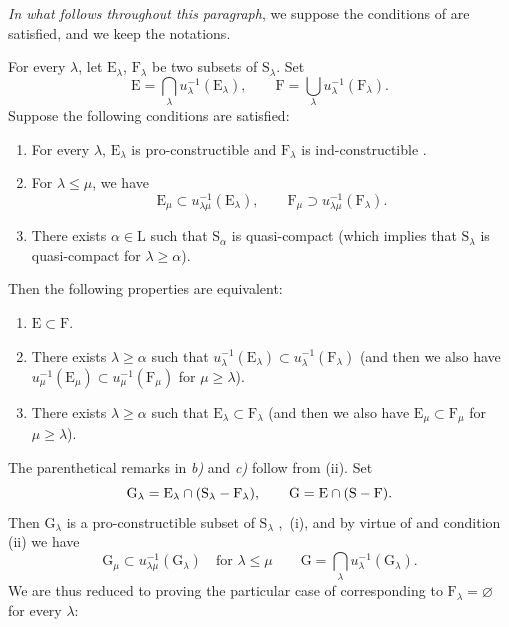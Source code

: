 \begin{env}[8.3.1]
\label{IV.8.3.1}
\emph{In what follows throughout this paragraph}, we suppose the conditions of  are satisfied, and we keep the notations.
\end{env}

\begin{theorem}[8.3.2]
\label{IV.8.3.2}
For every $\lambda$, let $\mathrm{E}_\lambda$, $\mathrm{F}_\lambda$ be two subsets of $\mathrm{S}_\lambda$.
Set
\begin{equation}
  \mathrm{E}=\bigcap_\lambda u_\lambda^{-1}(\mathrm{E}_\lambda),\qquad \mathrm{F}=\bigcup_\lambda u_\lambda^{-1}(\mathrm{F}_\lambda).
  \tag{8.3.2.1}
\label{IV.8.3.2.1}
\end{equation}
Suppose the following conditions are satisfied:
\begin{enumerate}[label=\textup{(\roman*)}]
  \item For every $\lambda$, $\mathrm{E}_\lambda$ is pro-constructible and $\mathrm{F}_\lambda$ is ind-constructible .
  \item For $\lambda\leqslant\mu$, we have
  \[
    \mathrm{E}_\mu\subset u_{\lambda\mu}^{-1}(\mathrm{E}_\lambda),\qquad \mathrm{F}_\mu\supset u_{\lambda\mu}^{-1}(\mathrm{F}_\lambda).
  \]
  \item There exists $\alpha\in\mathrm{L}$ such that $\mathrm{S}_\alpha$ is quasi-compact \textup{(which implies that $\mathrm{S}_\lambda$ is quasi-compact for $\lambda\geqslant\alpha$)}.
\end{enumerate}
Then the following properties are equivalent:
\begin{enumerate}[label=\emph{\alph*)}]
  \item $\mathrm{E}\subset\mathrm{F}$.
  \item There exists $\lambda\geqslant\alpha$ such that $u_\lambda^{-1}(\mathrm{E}_\lambda)\subset u_\lambda^{-1}(\mathrm{F}_\lambda)$ \textup{(and then we also have $u_\mu^{-1}(\mathrm{E}_\mu)\subset u_\mu^{-1}(\mathrm{F}_\mu)$ for}
\textup{$\mu\geqslant\lambda$)}.
  \item There exists $\lambda\geqslant\alpha$ such that $\mathrm{E}_\lambda\subset\mathrm{F}_\lambda$ \textup{(and then we also have $\mathrm{E}_\mu\subset\mathrm{F}_\mu$ for $\mu\geqslant\lambda$)}.
\end{enumerate}
\end{theorem}

The parenthetical remarks in \emph{b)} and \emph{c)} follow from (ii).
Set
\[
  \mathrm{G}_\lambda=\mathrm{E}_\lambda\cap(\mathrm{S}_\lambda- \mathrm{F}_\lambda),\qquad \mathrm{G}=\mathrm{E}\cap(\mathrm{S}-\mathrm{F}).
\]
Then $\mathrm{G}_\lambda$ is a pro-constructible subset of $\mathrm{S}_\lambda$ ,~(i), and by virtue of  and condition (ii) we have
\[
  \mathrm{G}_\mu\subset u_{\lambda\mu}^{-1}(\mathrm{G}_\lambda)\quad\text{for }\lambda\leqslant\mu\qquad\mathrm{G}=\bigcap_\lambda u_\lambda^{-1}(\mathrm{G}_\lambda).
\]
We are thus reduced to proving the particular case of  corresponding to $\mathrm{F}_\lambda=\varnothing$ for every $\lambda$:


